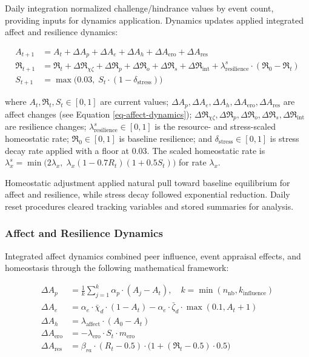 \documentclass[
  letterpaper,
  DIV=11,
  numbers=noendperiod]{scrartcl}
\begin{document}
Daily integration normalized challenge/hindrance values by event count,
providing inputs for dynamics application. Dynamics updates applied
integrated affect and resilience dynamics:

\begin{align}
A_{t+1} &= A_t + \Delta A_p + \Delta A_e + \Delta A_h + \Delta A_{\mathrm{ero}} + \Delta A_{\mathrm{res}} \\
\mathfrak{R}_{t+1} &= \mathfrak{R}_t + \Delta \mathfrak{R}_{\chi\zeta} + \Delta \mathfrak{R}_p + \Delta \mathfrak{R}_o + \Delta \mathfrak{R}_s + \Delta \mathfrak{R}_{\mathrm{int}} + \lambda_{\text{resilience}}^{s} \cdot (\mathfrak{R}_{\text{0}} - \mathfrak{R}_t) \\
S_{t+1} &= \max\big(0.03,\; S_t \cdot (1 - \delta_{\text{stress}})\big)
\label{eq-dynamics-updates}
\end{align}

where \(A_t, \mathfrak{R}_t, S_t \in [0,1]\) are current values;
\(\Delta A_p, \Delta A_e, \Delta A_h, \Delta A_{\mathrm{ero}}, \Delta A_{\mathrm{res}}\)
are affect changes (see Equation \ref{eq-affect-dynamics});
\(\Delta \mathfrak{R}_{\chi\zeta}, \Delta \mathfrak{R}_p, \Delta \mathfrak{R}_o, \Delta \mathfrak{R}_s, \Delta \mathfrak{R}_{\mathrm{int}}\)
are resilience changes; \(\lambda_{\text{resilience}}^{s} \in [0,1]\) is
the resource- and stress-scaled homeostatic rate;
\(\mathfrak{R}_{\text{0}} \in [0,1]\) is baseline resilience; and
\(\delta_{\text{stress}} \in [0,1]\) is stress decay rate applied with a
floor at 0.03. The scaled homeostatic rate is
\(\lambda_x^s = \min\big(2\lambda_x,\; \lambda_x (1 - 0.7R_t)(1 + 0.5S_t)\big)\)
for rate \(\lambda_x\).

Homeostatic adjustment applied natural pull toward baseline equilibrium
for affect and resilience, while stress decay followed exponential
reduction. Daily reset procedures cleared tracking variables and stored
summaries for analysis.

\subsubsection{Affect and Resilience
Dynamics}\label{affect-and-resilience-dynamics}

Integrated affect dynamics combined peer influence, event appraisal
effects, and homeostasis through the following mathematical framework:

\begin{align}
\Delta A_p &= \frac{1}{k} \sum_{j=1}^{k} \alpha_p \cdot (A_j - A_t), \quad k = \min(n_{\mathrm{nb}}, k_{\text{influence}}) \\
\Delta A_e &= \alpha_e \cdot \bar{\chi}_d \cdot (1 - A_t) - \alpha_e \cdot \bar{\zeta}_d \cdot \max(0.1, A_t + 1) \\
\Delta A_h &= \lambda_{\text{affect}} \cdot (A_{\text{0}} - A_t) \\
\Delta A_{\mathrm{ero}} &= -\lambda_{\mathrm{ero}} \cdot S_t \cdot m_{\mathrm{ero}} \\
\Delta A_{\mathrm{res}} &= \beta_{ra} \cdot (R_t - 0.5) \cdot \big(1 + (\mathfrak{R}_t - 0.5) \cdot 0.5\big)
\label{eq-affect-dynamics}
\end{align}
\end{document}
